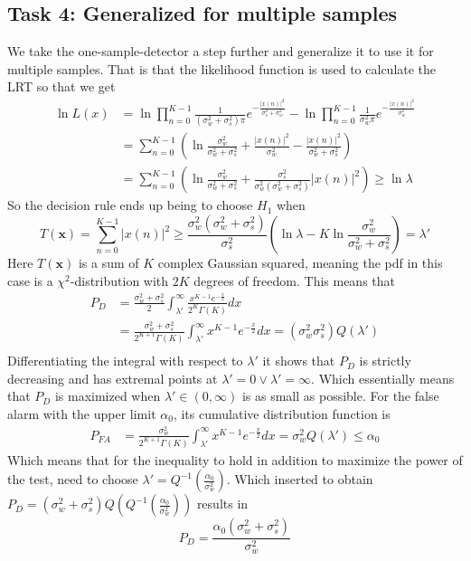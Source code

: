 \subsection{Task 4: Generalized for multiple samples}
We take the one-sample-detector a step further and generalize it to use it for multiple samples. That is that the likelihood function is used to calculate the LRT so that we get
\begin{align}
    \ln L(x) & = \ln\prod_{n=0}^{K-1}\frac{1}{(\sigma_w^2+\sigma_s^2)\pi}e^{-\frac{|x(n)|^2}{\sigma_s^2+\sigma_w^2}}-\ln\prod_{n=0}^{K-1}\frac{1}{\sigma_w^2\pi}e^{-\frac{|x(n)|^2}{\sigma_w^2}}\nonumber\\
    & = \sum_{n=0}^{K-1}\left(\ln\frac{\sigma_w^2}{\sigma_w^2+\sigma_s^2} + \frac{|x(n)|^2}{\sigma_w^2}-\frac{|x(n)|^2}{\sigma_w^2+\sigma_s^2} \right)\nonumber\\
    & = \sum_{n=0}^{K-1}\left(\ln\frac{\sigma_w^2}{\sigma_w^2+\sigma_s^2} + \frac{\sigma_s^2}{\sigma_w^2(\sigma_w^2+\sigma_s^2)}|x(n)|^2\right)\geq\ln\lambda\nonumber
\end{align}
So the decision rule ends up being to choose $H_1$ when
\begin{equation}
    T(\mathbf{x}) = \sum_{n=0}^{K-1}|x(n)|^2 \geq \frac{\sigma_w^2(\sigma_w^2+\sigma_s^2)}{\sigma_s^2}\left(\ln\lambda-K\ln\frac{\sigma_w^2}{\sigma_w^2+\sigma_s^2}\right) = \lambda'
\end{equation}
Here $T(\mathbf{x})$ is a sum of $K$ complex Gaussian squared, meaning the pdf in this case is a $\chi^2$-distribution with $2K$ degrees of freedom. This means that
\begin{align}
    P_D & = \frac{\sigma_w^2+\sigma_s^2}{2}\int_{\lambda'}^{\infty}\frac{x^{K-1}e^{-\frac{x}{2}}}{2^K\Gamma(K)}dx\nonumber\\
    & = \frac{\sigma_w^2+\sigma_s^2}{2^{K+1}\Gamma(K)}\int_{\lambda'}^{\infty}x^{K-1}e^{-\frac{x}{2}}dx = (\sigma_w^2\sigma_s^2)Q(\lambda')\\
\end{align}
Differentiating the integral with respect to $\lambda'$ it shows that $P_D$ is strictly decreasing and has extremal points at $\lambda'=0\vee\lambda'=\infty$. Which essentially means that $P_D$ is maximized when $\lambda'\in(0,\infty)$ is as small as possible. For the false alarm with the upper limit $\alpha_0$, its cumulative distribution function is
\begin{align}
    P_{FA} & = \frac{\sigma_w^2}{2^{K+1}\Gamma(K)}\int_{\lambda'}^{\infty}x^{K-1}e^{-\frac{x}{2}}dx = \sigma_w^2Q(\lambda') \leq \alpha_0
\end{align}
Which means that for the inequality to hold in addition to maximize the power of the test, need to choose $\lambda' = Q^{-1}(\frac{\alpha_0}{\sigma_w^2})$. Which inserted to obtain $P_D = (\sigma_w^2+\sigma_s^2)Q(Q^{-1}(\frac{\alpha_0}{\sigma_w^2}))$ results in
\begin{equation}
    P_D = \frac{\alpha_0(\sigma_w^2+\sigma_s^2)}{\sigma_w^2}
\end{equation}

